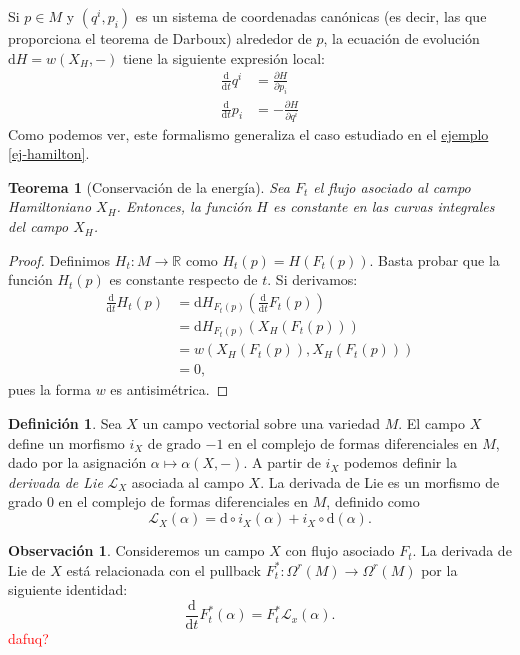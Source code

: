 \documentclass[11pt, a4paper]{article}
\newcommand{\RR}{\mathbb{R}}
\newcommand{\LL}{\mathcal{L}}
\theoremstyle{plain}
\newtheorem{thm}[prop]{Teorema}
\theoremstyle{definition}
\newtheorem{defn}[prop]{Definición}
\newtheorem{obs}[prop]{Observación}
\begin{document}
Si $p\in M$ y $(q^i,p_i)$ es un sistema de coordenadas canónicas (es decir, las que proporciona el teorema de Darboux) alrededor de $p$, la ecuación de evolución $\mathrm{d}H = w(X_H, -)$ tiene la siguiente expresión local:
\begin{align*}
\frac{\mathrm{d}}{\mathrm{d}t}q^i &= \frac{\partial H}{\partial p_i}\\
\frac{\mathrm{d}}{\mathrm{d}t}p_i &= -\frac{\partial H}{\partial q^i}
\end{align*}
Como podemos ver, este formalismo generaliza el caso estudiado en el \hyperref[ej-hamilton]{ejemplo \ref*{ej-hamilton}}.

\begin{thm}[Conservación de la energía] Sea $F_t$ el flujo asociado al campo Hamiltoniano $X_H$. Entonces, la función $H$ es constante en las curvas integrales del campo $X_H$.
\end{thm}
\begin{proof} Definimos $H_t:M\to \RR$ como $H_t(p)=H(F_t(p))$. Basta probar que la función $H_t(p)$ es constante respecto de $t$. Si derivamos:
\begin{align*}\frac{\mathrm{d}}{\mathrm{d}t} H_t(p)&=\mathrm{d}H_{F_t(p)}\left(\frac{\mathrm{d}}{\mathrm{d}t} F_t(p)\right)\\
&=\mathrm{d}H_{F_t(p)}\left(X_H(F_t(p))\right)\\
&= w\left(X_H(F_t(p)), X_H(F_t(p))\right)\\
&= 0,
\end{align*}
pues la forma $w$ es antisimétrica.
\end{proof}
\begin{defn} Sea $X$ un campo vectorial sobre una variedad $M$. El campo $X$ define un morfismo $i_X$ de grado $-1$ en el complejo de formas diferenciales en $M$, dado por la asignación $\alpha\mapsto \alpha(X,-)$. A partir de $i_X$ podemos definir la \emph{derivada de Lie} $\LL_X$ asociada al campo $X$. La derivada de Lie es un morfismo de grado $0$ en el complejo de formas diferenciales en $M$, definido como
\[\LL_X(\alpha) = \mathrm{d}\circ i_X(\alpha) + i_X\circ\mathrm{d}(\alpha).\]
\end{defn}
\begin{obs} Consideremos un campo $X$ con flujo asociado $F_t$. La derivada de Lie de $X$ está relacionada con el pullback $F_t^*:\Omega^r(M)\to\Omega^r(M)$ por la siguiente identidad:
\begin{equation}
\label{der-lie}
\frac{\mathrm{d}}{\mathrm{d}t} F_t^*(\alpha) = F_t^*\LL_x(\alpha).
\end{equation}
\textcolor{red}{dafuq?}
\end{obs}
\end{document}
